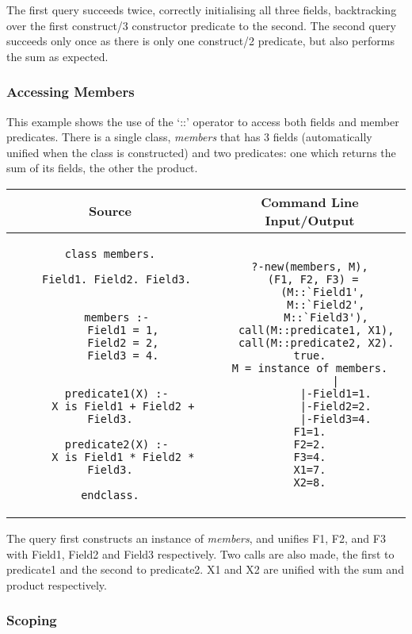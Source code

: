 \documentclass[12pt,a4paper,twoside,openright]{report}
\begin{document}
The first query succeeds twice, correctly initialising all three fields, backtracking over the first construct/3 constructor predicate to the second. The second query succeeds only once as there is only one construct/2 predicate, but also performs the sum as expected.

	\subsubsection{Accessing Members}
	
This example shows the use of the `::' operator to access both fields and member predicates. There is a single class, \emph{members} that has 3 fields (automatically unified when the class is constructed) and two predicates: one which returns the sum of its fields, the other the product.
	
	\begin{center}
\begin{tabular}{c|c}
Source & Command Line Input/Output \\
\hline
	\small
\begin{lstlisting}
class members.

  Field1. Field2. Field3.
  
  
  members :-
    Field1 = 1,
    Field2 = 2,
    Field3 = 4.


  predicate1(X) :-
    X is Field1 + Field2 + Field3.
    
  predicate2(X) :-
    X is Field1 * Field2 * Field3.
    
endclass.
\end{lstlisting}
&
	\small
\begin{lstlisting}
?-new(members, M),
  (F1, F2, F3) = 
    (M::`Field1',
     M::`Field2',
     M::`Field3'),
  call(M::predicate1, X1),
  call(M::predicate2, X2).
true.
M = instance of members.
        |
        |-Field1=1.
        |-Field2=2.
        |-Field3=4.
F1=1.
F2=2.
F3=4.
X1=7.
X2=8.
\end{lstlisting}
\\
\end{tabular}
\end{center}

The query first constructs an instance of  \emph{members}, and unifies F1, F2, and F3 with Field1, Field2 and Field3 respectively. Two calls are also made, the first to predicate1 and the second to predicate2. X1 and X2 are unified with the sum and product respectively.

	\subsubsection{Scoping}
	
\end{document}

